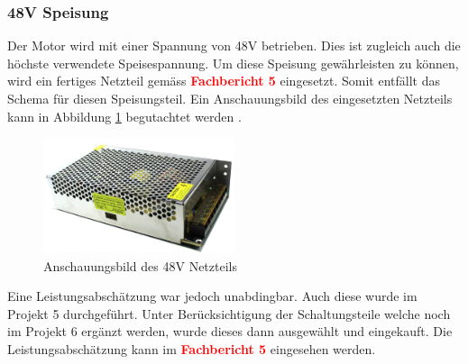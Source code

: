 \subsubsection{48V Speisung}
\label{subsubec:48V Speisung}


Der Motor wird mit einer Spannung von 48V betrieben. Dies ist zugleich auch die höchste verwendete Speisespannung. Um diese Speisung gewährleisten zu können, wird ein fertiges Netzteil gemäss  \textcolor{red}{\textbf{Fachbericht 5}} eingesetzt. Somit entfällt das Schema für diesen Speisungsteil. Ein Anschauungsbild des eingesetzten Netzteils kann in Abbildung \ref{fig:Netzteil_48V} begutachtet werden \cite{aliexpress_us_nodate}.\\

\begin{figure}[h!]
	\centering
	\includegraphics[width=0.5\textwidth]{graphics/Netzteil_48V.png}
	\caption{Anschauungsbild des 48V Netzteils \cite{aliexpress_us_nodate}}
	\label{fig:Netzteil_48V}
\end{figure} 

Eine Leistungsabschätzung war jedoch unabdingbar. Auch diese wurde im Projekt 5 durchgeführt. Unter Berücksichtigung der Schaltungsteile welche noch im Projekt 6 ergänzt werden, wurde dieses dann ausgewählt und eingekauft. Die Leistungsabschätzung kann im \textcolor{red}{\textbf{Fachbericht 5}} eingesehen werden. 

\newpage